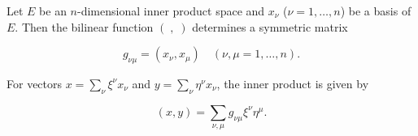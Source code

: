Let \(E\) be an \(n\)-dimensional inner product space and \(x_{\nu}\) (\(\nu = 1, \ldots, n\)) be a basis of \(E\). Then the bilinear function \(( \; , \; )\) determines a symmetric matrix

$$g_{\nu\mu} = (x_{\nu}, x_{\mu}) \quad (\nu, \mu = 1, \ldots, n).$$

For vectors \(x = \sum_{\nu} \xi^{\nu} x_{\nu}\) and \(y = \sum_{\nu} \eta^{\nu} x_{\nu}\), the inner product is given by

$$(x, y) = \sum_{\nu, \mu} g_{\nu\mu} \xi^{\nu} \eta^{\mu}.$$
